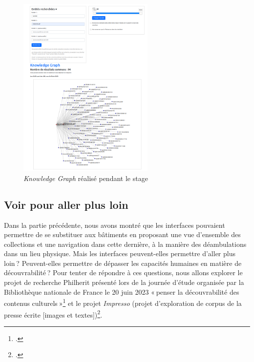 \begin{figure}[h!]
	\centering
	\includegraphics[width=0.6\textwidth]{images/imageknowledge.png}
	\caption{\textit{Knowledge Graph} réalisé pendant le stage}
	\label{fig:imageknowledge}
\end{figure}


\subsection{Voir pour aller plus loin}

Dans la partie précédente, nous avons montré que les interfaces pouvaient permettre de se substituer aux bâtiments en proposant une vue d’ensemble des collections et une navigation dans cette dernière, à la manière des déambulations dans un lieu physique. Mais les interfaces peuvent-elles permettre d’aller plus loin ? Peuvent-elles permettre de dépasser les capacités humaines en matière de découvrabilité ? Pour tenter de répondre à ces questions, nous allons explorer le projet de recherche Philherit présenté lors de la journée d’étude organisée par la Bibliothèque nationale de France le 20 juin 2023 « penser la découvrabilité des contenus culturels »\footcite{plouviez_philosophie_2023} et le projet \textit{Impresso} (projet d’exploration de corpus de la presse écrite [images et textes])\footcite{noauthor_impresso_nodate}.

